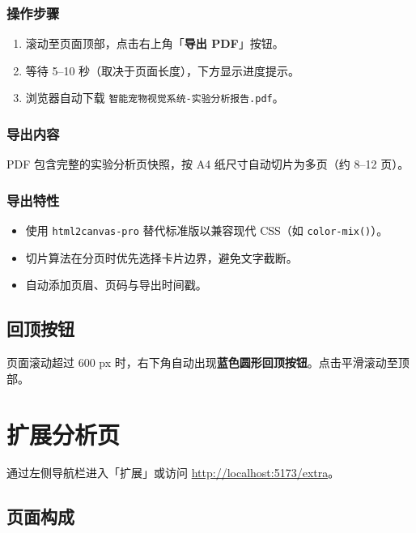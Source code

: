 \documentclass[12pt, a4paper, openany]{ctexbook}
\begin{document}
\subsection{操作步骤}

\begin{enumerate}
  \item 滚动至页面顶部，点击右上角「\textbf{导出 PDF}」按钮。
  \item 等待 5–10 秒（取决于页面长度），下方显示进度提示。
  \item 浏览器自动下载 \texttt{智能宠物视觉系统-实验分析报告.pdf}。
\end{enumerate}

\subsection{导出内容}

PDF 包含完整的实验分析页快照，按 A4 纸尺寸自动切片为多页（约 8–12 页）。

\subsection{导出特性}

\begin{itemize}
  \item 使用 \texttt{html2canvas-pro} 替代标准版以兼容现代 CSS（如 \texttt{color-mix()}）。
  \item 切片算法在分页时优先选择卡片边界，避免文字截断。
  \item 自动添加页眉、页码与导出时间戳。
\end{itemize}

\section{回顶按钮}

页面滚动超过 600 px 时，右下角自动出现\textbf{蓝色圆形回顶按钮}。点击平滑滚动至顶部。

\chapter{扩展分析页}

通过左侧导航栏进入「扩展」或访问 \url{http://localhost:5173/extra}。

\section{页面构成}
\end{document}
